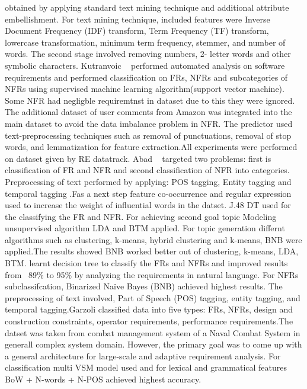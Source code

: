 obtained by applying standard text mining technique and additional attribute
embellishment. For text mining technique, included features were Inverse
Document Frequency (IDF) transform, Term Frequency (TF) transform, lowercase
transformation, minimum term frequency, stemmer, and number of words. The second
stage involved removing numbers, 2- letter words and other symbolic characters.
Kutranvoic \etal ~ \cite {Kurtanovic:2017}performed automated analysis on
software requirements and performed classification on FRs, NFRs and
subcategories of NFRs using supervised machine learning algorithm(support vector
machine). Some NFR had negligble requiremtnst in dataset due to this they were
ignored. The additional dataset of user comments from Amazon was integrated into
the main dataset to avoid the data imbalance problem in NFR. The predictor used
text-preprocessing techniques such as removal of punctuations, removal of stop
words, and lemmatization for feature extraction.All experiments were performed
on dataset given by RE datatrack.
 Abad \etal ~ \cite{Abad:2017} targeted two problems: first is classification of 
 FR and NFR and second classification of NFR into categories. Preprocessing of
 text performed by applying: POS tagging, Entity tagging and temporal tagging
 .Fas a next step feature co-occurrence and regular expression used to increase
 the weight of influential words in the datset. J.48 DT used for the classifying
 the FR and NFR. For achieving second goal topic Modeling unsupervised algorithm
 LDA and BTM applied. For topic generation differnt algorithms such as
 clustering, k-means, hybrid clustering and k-means, BNB were applied.The
 results showed BNB worked better out of clustering, k-means, LDA, BTM.
learnt decision tree to classify the FRs and NFRs and improved results from
~89\% to 95\% by analyzing the requirements in natural language. For NFRs
subclassifcation, Binarized Naïve Bayes (BNB) achieved highest results. The
preprocessing of text involved, Part of Speech (POS) tagging, entity tagging,
and temporal tagging.Garzoli \cite {Garzoli:2013} classified data into five
types: FRs, NFRs, design and construction constraints, operator requirements,
performance requirements.The datset was taken from combat management system of a
Naval Combat System in generall complex system domain. However, the primary goal
was to come up with a general architecture for large-scale and adaptive
requirement analysis. For classification multi VSM model used and for lexical and grammatical features BoW + N-words + N-POS achieved highest accuracy. 
